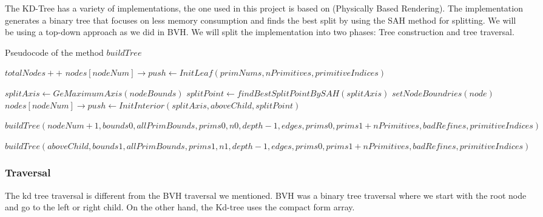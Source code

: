 \documentclass[11pt,a4paper]{article}
\begin{document}
The KD-Tree has a variety of implementations, the one used in this project is based on (Physically Based Rendering). The implementation generates a binary tree that focuses on less memory consumption and finds the best split by using the SAH method for splitting. We will be using a top-down approach as we did in BVH. We will split the implementation into two phases: Tree construction and tree traversal.



\begin{algorithm}[H]
\caption{Pseudocode of the method $buildTree$}\label{alg:alg1}
\begin{algorithmic}
\State $totalNodes++$
	\State $nodes[nodeNum] \rightarrow push \gets InitLeaf(primNums, nPrimitives, primitiveIndices)$
	\State \Return
\EndIf

\State $splitAxis \gets GeMaximumAxis(nodeBounds)$
\State $splitPoint \gets findBestSplitPointBySAH(splitAxis)$
\State $setNodeBoundries(node)$
\State $nodes[nodeNum] \rightarrow push \gets InitInterior(splitAxis, aboveChild, splitPoint)$

\State $buildTree(nodeNum+1, bounds0, allPrimBounds, prims0, n0, depth - 1, edges, prims0, prims1 + nPrimitives, badRefines, primitiveIndices)$

\State $buildTree(aboveChild, bounds1, allPrimBounds, prims1, n1, depth - 1, edges, prims0, prims1 + nPrimitives, badRefines, primitiveIndices)$

\EndFunction
\end{algorithmic}
\end{algorithm}

\subsubsection{Traversal}
The kd tree traversal is different from the BVH traversal we mentioned. BVH was a binary tree traversal where we start with the root node and go to the left or right child. On the other hand, the Kd-tree uses the compact form array. 
\end{document}
